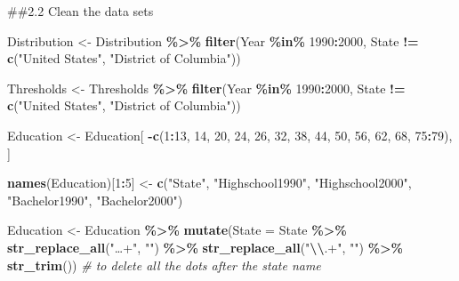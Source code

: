 \documentclass[
]{article}
\newenvironment{Shaded}{\begin{snugshade}}{\end{snugshade}}
\newcommand{\AttributeTok}[1]{\textcolor[rgb]{0.13,0.29,0.53}{#1}}
\newcommand{\CommentTok}[1]{\textcolor[rgb]{0.56,0.35,0.01}{\textit{#1}}}
\newcommand{\DecValTok}[1]{\textcolor[rgb]{0.00,0.00,0.81}{#1}}
\newcommand{\FunctionTok}[1]{\textcolor[rgb]{0.13,0.29,0.53}{\textbf{#1}}}
\newcommand{\NormalTok}[1]{#1}
\newcommand{\OtherTok}[1]{\textcolor[rgb]{0.56,0.35,0.01}{#1}}
\newcommand{\SpecialCharTok}[1]{\textcolor[rgb]{0.81,0.36,0.00}{\textbf{#1}}}
\newcommand{\StringTok}[1]{\textcolor[rgb]{0.31,0.60,0.02}{#1}}
\begin{document}
\#\#2.2 Clean the data sets

\begin{Shaded}
\begin{Highlighting}[]
\NormalTok{Distribution }\OtherTok{\textless{}{-}}\NormalTok{ Distribution }\SpecialCharTok{\%\textgreater{}\%}
  \FunctionTok{filter}\NormalTok{(Year }\SpecialCharTok{\%in\%} \DecValTok{1990}\SpecialCharTok{:}\DecValTok{2000}\NormalTok{, }
\NormalTok{         State }\SpecialCharTok{!=} \FunctionTok{c}\NormalTok{(}\StringTok{"United States"}\NormalTok{, }\StringTok{"District of Columbia"}\NormalTok{))}

\NormalTok{Thresholds }\OtherTok{\textless{}{-}}\NormalTok{ Thresholds }\SpecialCharTok{\%\textgreater{}\%}
  \FunctionTok{filter}\NormalTok{(Year }\SpecialCharTok{\%in\%} \DecValTok{1990}\SpecialCharTok{:}\DecValTok{2000}\NormalTok{, }
\NormalTok{         State }\SpecialCharTok{!=} \FunctionTok{c}\NormalTok{(}\StringTok{"United States"}\NormalTok{, }\StringTok{"District of Columbia"}\NormalTok{))}

\NormalTok{Education }\OtherTok{\textless{}{-}}\NormalTok{ Education[ }\SpecialCharTok{{-}}\FunctionTok{c}\NormalTok{(}\DecValTok{1}\SpecialCharTok{:}\DecValTok{13}\NormalTok{, }\DecValTok{14}\NormalTok{, }\DecValTok{20}\NormalTok{, }\DecValTok{24}\NormalTok{, }\DecValTok{26}\NormalTok{, }\DecValTok{32}\NormalTok{, }\DecValTok{38}\NormalTok{, }\DecValTok{44}\NormalTok{, }\DecValTok{50}\NormalTok{, }\DecValTok{56}\NormalTok{, }\DecValTok{62}\NormalTok{, }\DecValTok{68}\NormalTok{, }\DecValTok{75}\SpecialCharTok{:}\DecValTok{79}\NormalTok{), ]}

\FunctionTok{names}\NormalTok{(Education)[}\DecValTok{1}\SpecialCharTok{:}\DecValTok{5}\NormalTok{] }\OtherTok{\textless{}{-}} \FunctionTok{c}\NormalTok{(}\StringTok{"State"}\NormalTok{, }\StringTok{"Highschool1990"}\NormalTok{, }\StringTok{"Highschool2000"}\NormalTok{, }\StringTok{"Bachelor1990"}\NormalTok{, }\StringTok{"Bachelor2000"}\NormalTok{)}

\NormalTok{Education }\OtherTok{\textless{}{-}}\NormalTok{ Education }\SpecialCharTok{\%\textgreater{}\%} 
  \FunctionTok{mutate}\NormalTok{(}\AttributeTok{State =}\NormalTok{ State }\SpecialCharTok{\%\textgreater{}\%}
           \FunctionTok{str\_replace\_all}\NormalTok{(}\StringTok{"…+"}\NormalTok{, }\StringTok{""}\NormalTok{) }\SpecialCharTok{\%\textgreater{}\%}
           \FunctionTok{str\_replace\_all}\NormalTok{(}\StringTok{"}\SpecialCharTok{\textbackslash{}\textbackslash{}}\StringTok{.+"}\NormalTok{, }\StringTok{""}\NormalTok{) }\SpecialCharTok{\%\textgreater{}\%}
           \FunctionTok{str\_trim}\NormalTok{()) }\CommentTok{\# to delete all the dots after the state name}
\end{Highlighting}
\end{Shaded}
\end{document}
